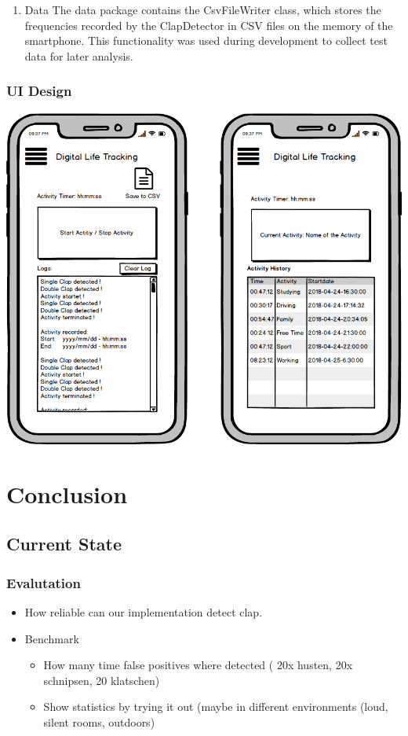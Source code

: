 \documentclass
[
 12pt, %
       DIV12,
       a4paper,
       oneside,
       titlepage,
       parskip=half,
       headings=normal,
       listof=totoc,
       bibliography=totoc,
       index=totoc,
       captions=tableheading,
       ]{scrreprt}
\begin{document}
\begin{enumerate}
\item Data
\label{sec:orgdeb052b}
The data package contains the CsvFileWriter class, which stores the frequencies recorded by the ClapDetector in 
CSV files on the memory of the smartphone. This functionality was used during development to collect test data 
for later analysis.
\end{enumerate}

\subsection{UI Design}
\label{sec:orgc19d2ea}

\begin{center}
\includegraphics[width=.9\linewidth]{./imgs/mock.png}
\end{center}

\chapter{Conclusion}
\label{sec:org9a10a6c}
\section{Current State}
\label{sec:org4afd87a}
\subsection{Evalutation}
\label{sec:org350e527}
\begin{itemize}
\item How reliable can our implementation detect clap.
\item Benchmark
\begin{itemize}
\item How many time false positives where detected ( 20x husten, 20x schnipsen, 20 klatschen)
\item Show statistics by trying it out (maybe in different environments (loud,
silent rooms, outdoors)
\end{itemize}
\end{itemize}
\end{document}
